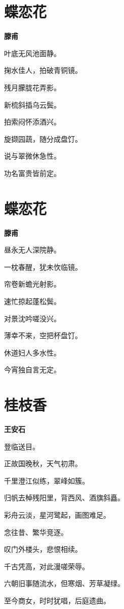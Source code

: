 \documentclass[12pt,a4paper]{ctexbook}
\begin{document}
\section{蝶恋花}
\textbf{滕甫}\par\vspace{0.5em}
叶底无风池面静。\par
掬水佳人，拍破青铜镜。\par
残月朦胧花弄影。\par
新梳斜插乌云鬓。\par
拍索闷怀添酒兴。\par
旋撷园蔬，随分成盘饤。\par
说与翠微休急性。\par
功名富贵皆前定。\par

\section{蝶恋花}
\textbf{滕甫}\par\vspace{0.5em}
昼永无人深院静。\par
一枕春醒，犹未忺临镜。\par
帘卷新蟾光射影。\par
速忙掠起蓬松鬓。\par
对景沈吟嗟没兴。\par
薄幸不来，空把杯盘饤。\par
休道妇人多水性。\par
今宵独自言无定。\par

\section{桂枝香}
\textbf{王安石}\par\vspace{0.5em}
登临送目。\par
正故国晚秋，天气初肃。\par
千里澄江似练，翠峰如簇。\par
归帆去棹残阳里，背西风、酒旗斜矗。\par
彩舟云淡，星河鹭起，画图难足。\par
念往昔、繁华竞逐。\par
叹门外楼头，悲恨相续。\par
千古凭高，对此漫嗟荣辱。\par
六朝旧事随流水，但寒烟、芳草凝绿。\par
至今商女，时时犹唱，后庭遗曲。\par
\end{document}
